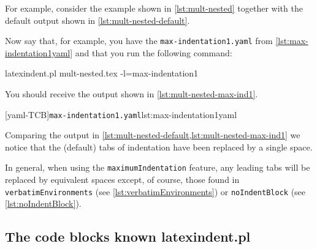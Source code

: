  \begin{example}
 For example, consider the example shown in \cref{lst:mult-nested} together with the
 default output shown in \cref{lst:mult-nested-default}.

 \begin{cmhtcbraster}[raster column skip=.1\linewidth]
 \end{cmhtcbraster}
 \end{example}

 \begin{example}
 Now say that, for example, you have the \texttt{max-indentation1.yaml} from
 \cref{lst:max-indentation1yaml} and that you run the following command:

 \begin{commandshell}
latexindent.pl mult-nested.tex -l=max-indentation1
\end{commandshell}

 You should receive the output shown in \cref{lst:mult-nested-max-ind1}.

 \begin{cmhtcbraster}
  [yaml-TCB]{\texttt{max-indentation1.yaml}}{lst:max-indentation1yaml}
 \end{cmhtcbraster}
 \end{example}

 Comparing the output in \cref{lst:mult-nested-default,lst:mult-nested-max-ind1} we notice
 that the (default) tabs of indentation have been replaced by a single space.

 In general, when using the \texttt{maximumIndentation} feature, any leading tabs will be
 replaced by equivalent spaces except, of course, those found in
 \texttt{verbatimEnvironments} (see \vref{lst:verbatimEnvironments}) or
 \texttt{noIndentBlock} (see \vref{lst:noIndentBlock}).

\subsection{The code blocks known latexindent.pl}\label{subsubsec:code-blocks}

